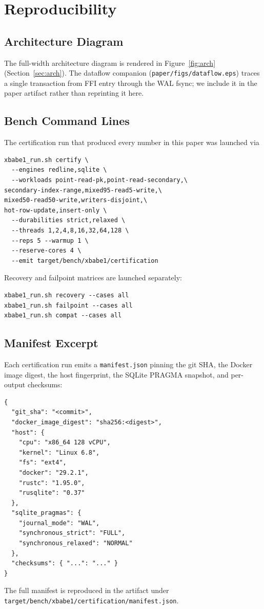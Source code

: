 \appendices
\section{Reproducibility}\label{sec:appendix}

\subsection{Architecture Diagram}
The full-width architecture diagram is rendered in
Figure~\ref{fig:arch} (Section~\ref{sec:arch}). The dataflow
companion (\texttt{paper/figs/dataflow.eps}) traces a single
transaction from FFI entry through the WAL fsync; we include it in
the paper artifact rather than reprinting it here.

\subsection{Bench Command Lines}
The certification run that produced every number in this paper was
launched via
\begin{lstlisting}[language={}]
xbabe1_run.sh certify \
  --engines redline,sqlite \
  --workloads point-read-pk,point-read-secondary,\
secondary-index-range,mixed95-read5-write,\
mixed50-read50-write,writers-disjoint,\
hot-row-update,insert-only \
  --durabilities strict,relaxed \
  --threads 1,2,4,8,16,32,64,128 \
  --reps 5 --warmup 1 \
  --reserve-cores 4 \
  --emit target/bench/xbabe1/certification
\end{lstlisting}
Recovery and failpoint matrices are launched separately:
\begin{lstlisting}[language={}]
xbabe1_run.sh recovery --cases all
xbabe1_run.sh failpoint --cases all
xbabe1_run.sh compat --cases all
\end{lstlisting}

\subsection{Manifest Excerpt}
Each certification run emits a \texttt{manifest.json} pinning the
git SHA, the Docker image digest, the host fingerprint, the SQLite
PRAGMA snapshot, and per-output checksums:
\begin{lstlisting}[language={}]
{
  "git_sha": "<commit>",
  "docker_image_digest": "sha256:<digest>",
  "host": {
    "cpu": "x86_64 128 vCPU",
    "kernel": "Linux 6.8",
    "fs": "ext4",
    "docker": "29.2.1",
    "rustc": "1.95.0",
    "rusqlite": "0.37"
  },
  "sqlite_pragmas": {
    "journal_mode": "WAL",
    "synchronous_strict": "FULL",
    "synchronous_relaxed": "NORMAL"
  },
  "checksums": { "...": "..." }
}
\end{lstlisting}
The full manifest is reproduced in the artifact under
\texttt{target/bench/xbabe1/certification/manifest.json}.
